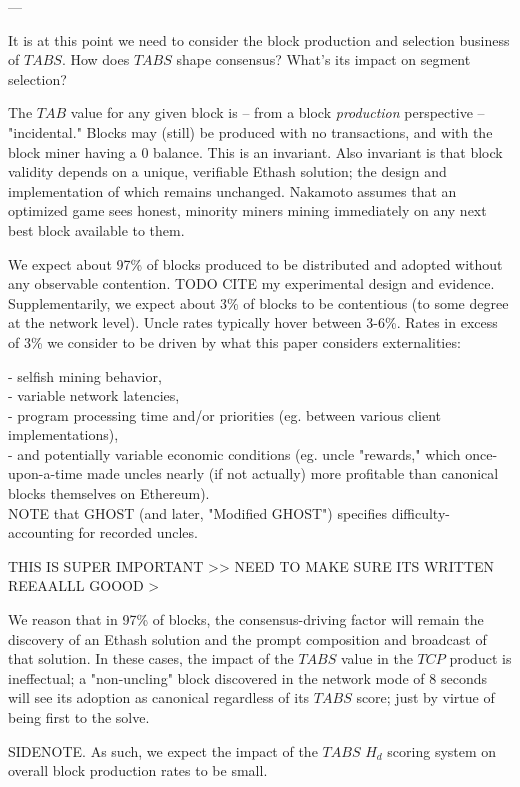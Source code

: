 \documentclass[11pt]{article}
\theoremstyle{plain}
\begin{document}
---

It is at this point we need to consider the block production and selection
business of $TABS$.
How does $TABS$ shape consensus? What's its impact on segment selection?

The $TAB$ value for any given block is -- from a block \textit{production}
perspective -- "incidental."
Blocks may (still) be produced with no transactions, and with the block miner
having a 0 balance. This is an invariant.
Also invariant is that block validity depends on a unique, verifiable Ethash
solution; the design and implementation of which remains unchanged.
Nakamoto assumes that an optimized game sees honest, minority miners mining
immediately on any next best block available to them.

We expect about 97\% of blocks produced to be distributed and adopted without
any observable contention. TODO CITE my experimental design and evidence.
Supplementarily, we expect about 3\% of blocks to be contentious (to some
degree at the network level).
Uncle rates typically hover between 3-6\%. Rates in excess of 3\% we consider
to be driven by what this paper considers externalities:

- selfish mining behavior, \\
- variable network latencies, \\
- program processing time and/or priorities (eg. between various client
implementations), \\
- and potentially variable economic conditions (eg. uncle "rewards," which
once-upon-a-time made uncles nearly (if not actually) more profitable than
canonical blocks themselves on Ethereum). \\

NOTE that GHOST (and later, "Modified GHOST") specifies difficulty-accounting
for recorded uncles.

THIS IS SUPER IMPORTANT >> NEED TO MAKE SURE ITS WRITTEN REEAALLL GOOOD >

We reason that in 97\% of blocks, the consensus-driving factor will remain the
discovery of an Ethash solution and the prompt composition and broadcast of
that solution.
In these cases, the impact of the $TABS$ value in the $TCP$ product is
ineffectual; a "non-uncling" block discovered in the network mode of 8 seconds
will see
its adoption as canonical regardless of its $TABS$ score; just by virtue of
being first to the solve.

SIDENOTE. As such, we expect the impact of the $TABS$ \times $H_{d}$ scoring
system on overall block production rates to be small.
\end{document}
